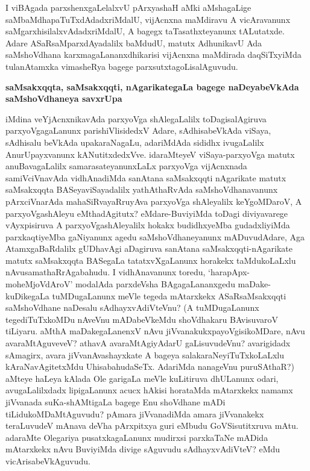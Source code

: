 \medskip
\noindent
I viBAgada parxshenxgaLelalxvU pArxyashaH aMki aMshagaLige saMbaMdhapaTuTxdAdadxriMdalU, vijAcnxna maMdi\-ravu A vicAravanunx saMgarxhisilalxvAdadxriMdalU, A bagegx taTasathxte\-yanunx tALutatxde. Adare ASaRsaMparx\-dAyadalilx baMdudU, matutx AdhunikavU Ada saMshoVdhana karxmagaLananxdhikarisi vijAcnxna maMdi\-rada daqSiTx\-yiMda tula\-nAtamxka vimasheRya bagege parxsutxtagoLisalAguvudu.

{\bigskip
\noindent
{\large\bf saMsakxqqta, saMsakxqqti, nAgarikategaLa bagege naDeyabeVkAda saMshoVdhaneya savxrUpa}}\label{page53c}

\medskip
\noindent
iMdina veYjAcnxnikavAda parxyoVga shAlegaLalilx toDagisalAgiruva parxyoVga\-gaLanunx parishiVli\-sidedxV Adare, sAdhisabeVkAda viSaya, sAdhisalu beVkAda upakaraNagaLu, adariMdAda sididhx ivugaLalilx Anu\-rUpayx\-vanunx kANutitxdedxVve. idaraMteyeV viSaya\--parxyoVga matutx anuBavagaLalilx samarasateyanunxLaLx parxyoVga vijAcnx\-nada samiV\-ciVnavAda vidhAnadiMda sanAtana saMsakxqqti nAgarikate matutx saMsakxqqta BASeya\break viSayadalilx yathAthaRvAda saMshoVdhanavanunx pArxciVnarAda mahaSiRvayaRru\break yAva parxyoVga shAle\-yalilx keY\-goM\-DaroV, A parxyoVgashAleyu eMthadA\-gitutx? eMdare-BuviyiMda toDagi diviyavarege vAyxpisiruva A parxyoVga\-shAle\-yalilx hokakx budidhxyeMba gudadxliyiMda parxkaqtiyeMba gaNiyanunx agedu saMshoV\-dhane\-yanunx mADuvudAdare, Aga AtamxgaBaRdalilx gUDhavAgi aDagiruva sanAtana saMsakxqqti\--nAgari\-kate matutx saMsakxqqta BASegaLa tatatxvXgaLanunx horakekx taMdukoLaLxlu nAvu\break samathaRrAgabahudu. I vidhAna\-vanunx toredu, `harapApx-moheMjoVdAroV' modalAda parxdeVsha BAgagaLananxgedu maDake-kuDikegaLa tuMDu\-gaLanunx meVle tegeda mAtarxkekx ASaRsaMsakxqqti saMshoVdhane naDesalu sAdhayxvAdiVteVnu? (A tuMDu\-gaLanunx tegediTuTxkoMDu nAveVnu mADabeVkeMdu shoVdhakaru BAvisuvaroV tiLiyaru. aMthA maDake\-gaLanenxV nAvu jiVvanakukxpayoVgisikoMDare, nAvu avaraMtAgu\-veveV? athavA avaraMtAgiyAdarU gaLisuvudeVnu? avarigidadx sAmagirx, avara jiVvanAvashayxkate A bageya salakaraNeyiTuTxkoLaLxlu kAraNa\-vAgi\-tetxMdu UhisabahudaSeTx. AdariMda nanageVnu puruSAthaR?) aMteye haLeya kAlada Ole garigaLa meVle kuLi\-tiruva dhULanunx odari, avugaLalilxdadx lipigaLanunx acucx hAkisi horataMda mAtarxkekx namamx jiVvanada suKa-shAMtigaLa bagege Enu shoVdhane mADi tiLidukoMDaMtAguvudu? pAmara jiVvanadiMda amara jiVvanakekx teraLuvudeV mAnava deVha \hbox{pArxpitxya} guri eMbudu GoVSisutitxruva mAtu. adaraMte Ole\-gariya pusatxkagaLanunx mudirxsi parxkaTaNe mADida mAtarxkekx nAvu BuviyiMda divige sAguvudu sAdhayx\-vAdiVteV? eMdu vicArisabeVkAguvudu.


